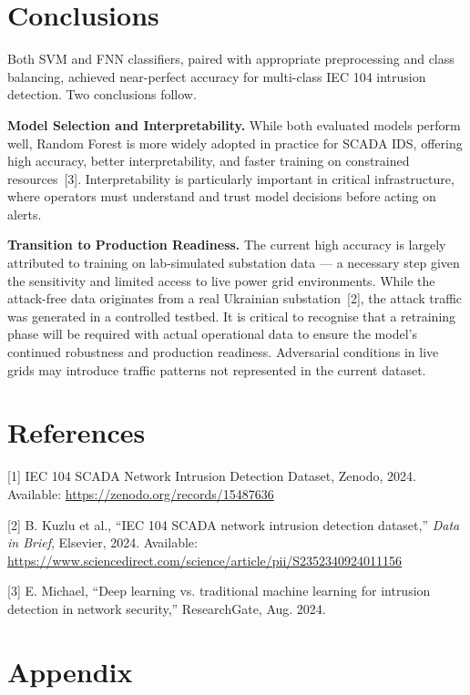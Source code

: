 \documentclass{article}
\begin{document}
\section{Conclusions}

Both SVM and FNN classifiers, paired with appropriate preprocessing and class balancing, achieved near-perfect accuracy for multi-class IEC 104 intrusion detection. Two conclusions follow.

\textbf{Model Selection and Interpretability.} While both evaluated models perform well, Random Forest is more widely adopted in practice for SCADA IDS, offering high accuracy, better interpretability, and faster training on constrained resources~[3]. Interpretability is particularly important in critical infrastructure, where operators must understand and trust model decisions before acting on alerts.

\textbf{Transition to Production Readiness.} The current high accuracy is largely attributed to training on lab-simulated substation data --- a necessary step given the sensitivity and limited access to live power grid environments. While the attack-free data originates from a real Ukrainian substation~[2], the attack traffic was generated in a controlled testbed. It is critical to recognise that a retraining phase will be required with actual operational data to ensure the model's continued robustness and production readiness. Adversarial conditions in live grids may introduce traffic patterns not represented in the current dataset.


\newpage
\section*{References}
\medskip
{
\small

[1] IEC 104 SCADA Network Intrusion Detection Dataset, Zenodo, 2024. Available: \url{https://zenodo.org/records/15487636}

[2] B. Kuzlu et al., “IEC 104 SCADA network intrusion detection dataset,” {\it Data in Brief}, Elsevier, 2024. Available: \url{https://www.sciencedirect.com/science/article/pii/S2352340924011156}

[3] E. Michael, “Deep learning vs. traditional machine learning for intrusion detection in network security,” ResearchGate, Aug. 2024.
}

\clearpage
\section*{Appendix}
\end{document}
